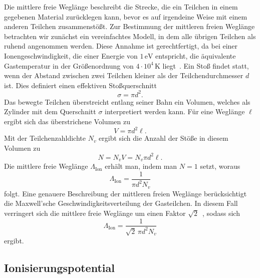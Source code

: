 \documentclass{article}
\begin{document}
Die mittlere freie Weglänge beschreibt die Strecke, die ein Teilchen in
einem gegebenen Material zurücklegen kann, bevor es auf irgendeine Weise
mit einem anderen Teilchen zusammenstößt. Zur Bestimmung der mittleren
freien Weglänge betrachten wir zunächst ein vereinfachtes Modell, in dem
alle übrigen Teilchen als ruhend angenommen werden. Diese Annahme ist
gerechtfertigt, da bei einer Ionengeschwindigkeit, die einer Energie von
$1\,\mathrm{eV}$ entspricht, die äquivalente Gastemperatur in der
Größenordnung von $4 \cdot 10^4\,\mathrm{K}$ liegt~\cite{Frieser1979}.
Ein Stoß findet statt, wenn der Abstand zwischen zwei Teilchen kleiner
als der Teilchendurchmesser $d$ ist. Dies definiert einen effektiven
Stoßquerschnitt
\begin{equation}
    \sigma = \pi d^2.
    \label{eq:stossquerschnitt}
\end{equation}
Das bewegte Teilchen überstreicht entlang seiner Bahn ein Volumen,
welches als Zylinder mit dem Querschnitt $\sigma$ interpretiert werden
kann. Für eine Weglänge $\ell$ ergibt sich das überstrichene Volumen zu
\begin{equation}
    V = \pi d^2 \ell.
    \label{eq:volumen}
\end{equation}
Mit der Teilchenzahldichte $N_v$ ergibt sich die Anzahl der Stöße in
diesem Volumen zu
\begin{equation}
    N = N_v V = N_v \pi d^2 \ell.
    \label{eq:stosszahl}
\end{equation}
Die mittlere freie Weglänge $\Lambda_{\mathrm{Ion}}$ erhält man, indem
man $N = 1$ setzt, woraus
\begin{equation}
    \Lambda_{\mathrm{Ion}} = \frac{1}{\pi d^2 N_v}
    \label{eq:mfp_einfach}
\end{equation}
folgt. Eine genauere Beschreibung der mittleren freien Weglänge
berücksichtigt die Maxwell'sche Geschwindigkeitsverteilung der
Gasteilchen. In diesem Fall verringert sich die mittlere freie Weglänge
um einen Faktor $\sqrt{2}$~\cite{demtroeder2018}, sodass sich
\begin{equation}
    \Lambda_{\mathrm{Ion}} = \frac{1}{\sqrt{2}\, \pi d^2 N_v}
    \label{eq:mfp_maxwell}
\end{equation}
ergibt.

\subsection{Ionisierungspotential}
\end{document}
